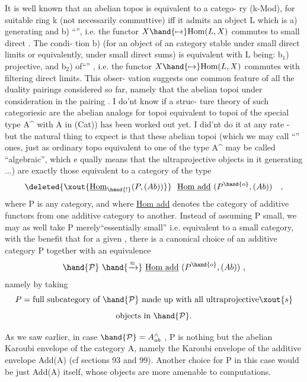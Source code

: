  It is well known that an abelian topos  is equivalent to a catego-%
ry (k-Mod), for suitable ring k (not necessarily commuttive) iff it 
admits an object L which is\hand{:} a) generating\hand{,} and b) ``\hand{\uline{\textcolor{black}{ultraprojective}}}'',
i.e. the functor $X\hand{\mapsto} \mathrm{Hom}(L,X)$ commutes to small direct  . The condi-%
tion b) (for an object of an \hand{\uline{\textcolor{black}{abelian}}} category stable under small direct
limits or equivalently, under small direct sums) is equivalent with L
being: b$_1$) projective, and b$_2$) of``\hand{\uline{\textcolor{black}{finite presentation}}}'' , i.e. the
functor $X\hand{\mapsto} \mathrm{Hom}(L,X)$ commutes with  filtering direct limits. This obser-%
vation suggests one common feature of all the  duality pairings considered
so far, namely that the abelian topoi under consideration in the pairing
. I do'nt know if a struc-%
ture theory of such categories\hand{,}\hand{(}ic are the abelian analogs  for topoi
equivalent to topoi of the special type A\^{}\hand{,} \deleted{(}with A in (Cat)) has been
worked out\xout{,} yet. I did'nt do it at any rate - but the natural thing to
expect is that these abelian topoi  (which we may call ``\hand{\uline{\textcolor{black}{algebraic}}}'' ones,
just as  ordinary topo equivalent to one of the type A\^{} may be called
``algebraic'', which e qually means that the  ultraprojective objects in it
  generating ...) are exactly those equivalent to a category of the type
\[ \deleted{\xout{\underline{\mathrm{Hom}}_{\hand{!}}(P,(Ab))}}\ \ \underline{\mathrm{Hom\ add}}\ (P^{\hand{o}}, (Ab)) \quad , \]
where P is any \hand{\uline{\textcolor{black}{small}}} \hand{\uline{\textcolor{black}{additive}}} category, and where \uline{Hom add} denotes
the category of additive functors from one additive category to another.
Instead of assuming P small, we may as well take P merely``essentially
small'' i.e. equivalent to a small category, with the benefit that for
a given  , there is a canonical choice of an additive category P
together with an equivalence
\[ \hand{\mathcal{P}}\ \hand{\xrightarrow{\approx}}\ \underline{\mathrm{Hom\ add}}\ (P^{\hand{o}}, (Ab)) \ , \]
namely by taking
\[ P = \text{full subcategory of } \hand{\mathcal{P}} \text{ made up with all ultraprojective}\xout{s} \]
\[ \text{objects in } \hand{\mathcal{P}}. \]

As we saw earlier, in case $\hand{\mathcal{P}} = A^{\wedge}_{ab}$ , P is nothing but the abelian
Karoubi envelope of the category A, namely the Karoubi envelope of
the additive envelope Add(A) (cf sections 93 and 99). Another choice
for P in this case would be just Add(A) itself, whose objects are more
amenable to computations.

